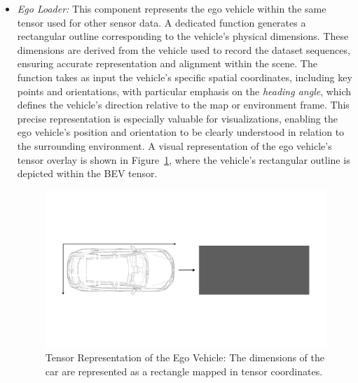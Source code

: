 \begin{itemize}
    \item \textit{Ego Loader:} This component represents the ego vehicle within the same tensor used for other sensor data. A dedicated function generates a rectangular outline corresponding to the vehicle's physical dimensions. These dimensions are derived from the vehicle used to record the dataset sequences, ensuring accurate representation and alignment within the scene.
    The function takes as input the vehicle's specific spatial coordinates, including key points and orientations, with particular emphasis on the \textit{heading angle}, which defines the vehicle's direction relative to the map or environment frame. This precise representation is especially valuable for visualizations, enabling the ego vehicle's position and orientation to be clearly understood in relation to the surrounding environment.
    A visual representation of the ego vehicle's tensor overlay is shown in Figure~\ref{fig:ego-loader}, where the vehicle's rectangular outline is depicted within the BEV tensor.

    \begin{minipage}{\linewidth}
    \begin{figure}[H]
        \centering
        \includegraphics[width=0.75\linewidth]{LateX//figs/egoLoader.pdf}
        \caption{Tensor Representation of the Ego Vehicle: The dimensions of the car are represented as a rectangle mapped in tensor coordinates.}
        \label{fig:ego-loader}
    \end{figure}
    \end{minipage}
    \vspace{0.25 cm}
    

\end{itemize}
